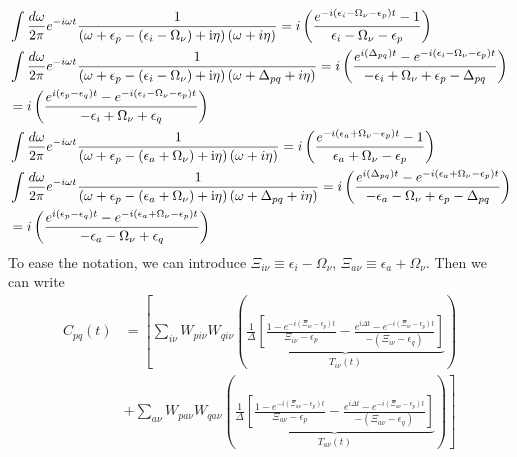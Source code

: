 \begin{align}
    &\int \frac{d\omega}{2\pi} e^{-i\omega t} \frac{1}{\left(\omega+\epsilon_p-\left(\epsilon_i-\Omega_\nu\right)+\mathrm{i} \eta\right)\left(\omega + i\eta\right)} = i\left(\frac{e^{-i(\epsilon_i - \Omega_\nu-\epsilon_p)t} - 1}{\epsilon_i - \Omega_\nu-\epsilon_p}\right) \\
    &\int \frac{d\omega}{2\pi} e^{-i\omega t} \frac{1}{\left(\omega+\epsilon_p-\left(\epsilon_i-\Omega_\nu\right)+\mathrm{i} \eta\right)\left(\omega + \Delta_{pq} + i\eta\right)} = i\left(\frac{e^{i(\Delta_{pq})t} - e^{-i(\epsilon_i - \Omega_\nu-\epsilon_p)t}}{-\epsilon_i + \Omega_\nu+\epsilon_p - \Delta_{pq}}\right) \\
&= i\left(\frac{e^{i(\epsilon_p - \epsilon_q)t} - e^{-i(\epsilon_i - \Omega_\nu-\epsilon_p)t}}{-\epsilon_i + \Omega_\nu+\epsilon_q}\right) \notag \\
    &\int \frac{d\omega}{2\pi} e^{-i\omega t} \frac{1}{\left(\omega+\epsilon_p-\left(\epsilon_a+\Omega_\nu\right)+\mathrm{i} \eta\right)\left(\omega + i\eta\right)} = i\left(\frac{e^{-i(\epsilon_a + \Omega_\nu-\epsilon_p)t} - 1}{\epsilon_a + \Omega_\nu-\epsilon_p}\right) \\
    &\int \frac{d\omega}{2\pi} e^{-i\omega t} \frac{1}{\left(\omega+\epsilon_p-\left(\epsilon_a+\Omega_\nu\right)+\mathrm{i} \eta\right)\left(\omega + \Delta_{pq} + i\eta\right)} = i\left(\frac{e^{i(\Delta_{pq})t} - e^{-i(\epsilon_a + \Omega_\nu-\epsilon_p)t}}{-\epsilon_a - \Omega_\nu+\epsilon_p - \Delta_{pq}}\right) \\
&= i\left(\frac{e^{i(\epsilon_p - \epsilon_q)t} - e^{-i(\epsilon_a + \Omega_\nu-\epsilon_p)t}}{-\epsilon_a - \Omega_\nu+\epsilon_q}\right) \notag
\end{align}
To ease the notation, we can introduce $\Xi_{i\nu} \equiv \epsilon_i - \Omega_\nu$, $\Xi_{a\nu} \equiv \epsilon_a + \Omega_\nu$. Then we can write
\begin{align}
C_{pq}(t) &=  \left[ \sum_{i\nu} W_{p i \nu} W_{q i \nu} \left(\underbrace{\frac{1}{\Delta}\left[\frac{1- e^{-i\left(\Xi_{i\nu} - \epsilon_p\right) t}}{\Xi_{i\nu}-\epsilon_p} - \frac{e^{i\Delta t} - e^{-i\left(\Xi_{i\nu} - \epsilon_p\right) t}}{-\left(\Xi_{i\nu} - \epsilon_q\right)}\right] }_{T_{i\nu}(t)}\right)\right.\\
& \left. + \sum_{a\nu} W_{p a \nu} W_{q a \nu} 
\left(\underbrace{\frac{1}{\Delta}\left[{\frac{1- e^{-i\left(\Xi_{a\nu} - \epsilon_p\right) t}}{\Xi_{a\nu}-\epsilon_p} - \frac{e^{i\Delta t} - e^{-i\left(\Xi_{a\nu} - \epsilon_p\right) t}}{-\left(\Xi_{a\nu} - \epsilon_q\right)} } \right]}_{T_{a\nu}(t)} \right)\right] \\
\end{align}

